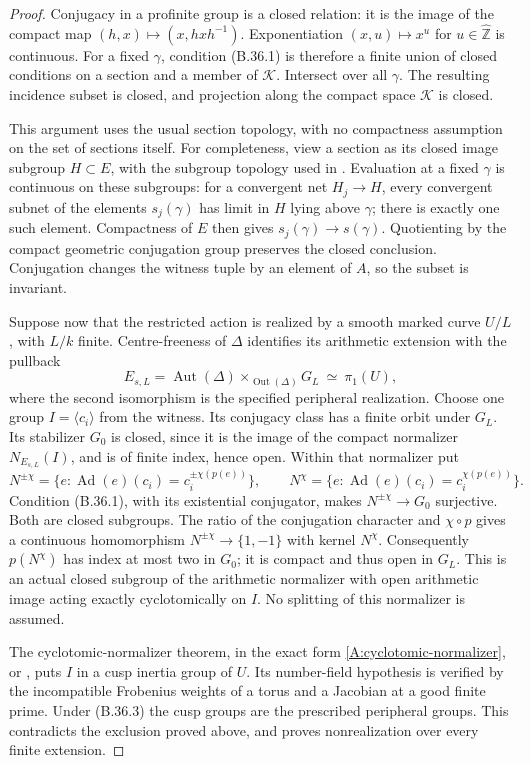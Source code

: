 \begin{proof}
Conjugacy in a profinite group is a closed relation:
it is the image of the compact map
$(h,x)\mapsto(x,hxh^{-1})$. Exponentiation
$(x,u)\mapsto x^u$ for $u\in\widehat{\mathbb Z}$ is
continuous. For a fixed $\gamma$, condition (B.36.1) is
therefore a finite union of closed conditions on a section
and a member of $\mathcal K$. Intersect over all $\gamma$.
The resulting incidence subset is closed, and projection
along the compact space $\mathcal K$ is closed.

This argument uses the usual section topology, with no
compactness assumption on the set of sections itself.
For completeness, view a section as its closed image
subgroup $H\subset E$, with the subgroup topology used in
\cite[Section 3]{B_CarlsonCorwin}. Evaluation at a fixed
$\gamma$ is continuous on these subgroups: for a convergent
net $H_j\to H$, every convergent subnet of the elements
$s_j(\gamma)$ has limit in $H$ lying above $\gamma$;
there is exactly one such element. Compactness of $E$
then gives $s_j(\gamma)\to s(\gamma)$. Quotienting by
the compact geometric conjugation group preserves the
closed conclusion. Conjugation changes the witness tuple
by an element of $A$, so the subset is invariant.

Suppose now that the restricted action is realized by a
smooth marked curve $U/L$, with $L/k$ finite. Centre-freeness
of $\Delta$ identifies its arithmetic extension with the
pullback
\[
 E_{s,L}=\operatorname{Aut}(\Delta)
       \mathop{\times}_{\operatorname{Out}(\Delta)}G_L
       \ \simeq\ \pi_1(U),
 \tag{B.36.3}
\]
where the second isomorphism is the specified peripheral
realization. Choose one group $I=\langle c_i\rangle$ from
the witness. Its conjugacy class has a finite orbit under
$G_L$. Its stabilizer $G_0$ is closed, since it is the image
of the compact normalizer $N_{E_{s,L}}(I)$, and is of finite
index, hence open. Within that normalizer put
\[
 N^{\pm\chi}=
 \{e:\operatorname{Ad}(e)(c_i)
            =c_i^{\pm\chi(p(e))}\},\qquad
 N^\chi=
 \{e:\operatorname{Ad}(e)(c_i)
            =c_i^{\chi(p(e))}\}.
 \tag{B.36.4}
\]
Condition (B.36.1), with its existential conjugator,
makes $N^{\pm\chi}\to G_0$ surjective. Both are closed
subgroups. The ratio of the conjugation character and
$\chi\circ p$ gives a continuous homomorphism
$N^{\pm\chi}\to\{1,-1\}$ with kernel $N^\chi$.
Consequently $p(N^\chi)$ has index at most two in $G_0$;
it is compact and thus open in $G_L$. This is an actual
closed subgroup of the arithmetic normalizer with open
arithmetic image acting exactly cyclotomically on $I$.
No splitting of this normalizer is assumed.

The cyclotomic-normalizer theorem, in the exact form
\ref{A:cyclotomic-normalizer}, or
\cite[Theorem 20]{B_StixCuspidal}, puts $I$ in a cusp
inertia group of $U$. Its number-field hypothesis is
verified by the incompatible Frobenius weights of a torus
and a Jacobian at a good finite prime. Under (B.36.3)
the cusp groups are the prescribed peripheral groups.
This contradicts the exclusion proved above, and proves
nonrealization over every finite extension.
\end{proof}

